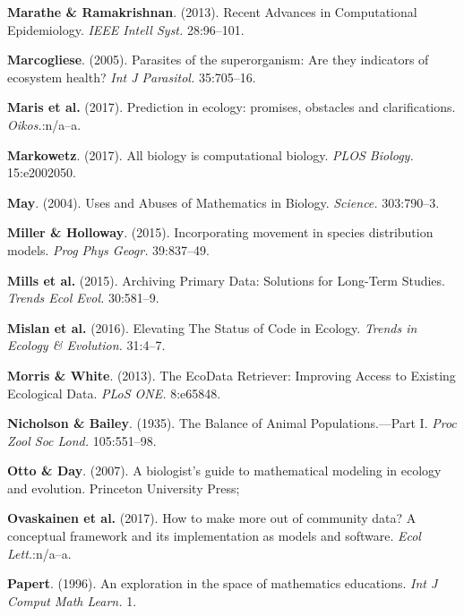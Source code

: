 \documentclass[12pt]{article}
\begin{document}
\leavevmode\hypertarget{ref-MaraRama13}{}%
\textbf{Marathe \& Ramakrishnan}. (2013). Recent Advances in
Computational Epidemiology. \emph{IEEE Intell Syst.} 28:96--101.

\leavevmode\hypertarget{ref-Marc05}{}%
\textbf{Marcogliese}. (2005). Parasites of the superorganism: Are they
indicators of ecosystem health? \emph{Int J Parasitol.} 35:705--16.

\leavevmode\hypertarget{ref-MariHune17}{}%
\textbf{Maris et al.} (2017). Prediction in ecology: promises, obstacles
and clarifications. \emph{Oikos.}:n/a--a.

\leavevmode\hypertarget{ref-Mark17}{}%
\textbf{Markowetz}. (2017). All biology is computational biology.
\emph{PLOS Biology.} 15:e2002050.

\leavevmode\hypertarget{ref-May04}{}%
\textbf{May}. (2004). Uses and Abuses of Mathematics in Biology.
\emph{Science.} 303:790--3.

\leavevmode\hypertarget{ref-MillHoll15}{}%
\textbf{Miller \& Holloway}. (2015). Incorporating movement in species
distribution models. \emph{Prog Phys Geogr.} 39:837--49.

\leavevmode\hypertarget{ref-MillTepl15}{}%
\textbf{Mills et al.} (2015). Archiving Primary Data: Solutions for
Long-Term Studies. \emph{Trends Ecol Evol.} 30:581--9.

\leavevmode\hypertarget{ref-MislHeer16}{}%
\textbf{Mislan et al.} (2016). Elevating The Status of Code in Ecology.
\emph{Trends in Ecology \& Evolution.} 31:4--7.

\leavevmode\hypertarget{ref-MorrWhit13}{}%
\textbf{Morris \& White}. (2013). The EcoData Retriever: Improving
Access to Existing Ecological Data. \emph{PLoS ONE.} 8:e65848.

\leavevmode\hypertarget{ref-NichBail35}{}%
\textbf{Nicholson \& Bailey}. (1935). The Balance of Animal
Populations.---Part I. \emph{Proc Zool Soc Lond.} 105:551--98.

\leavevmode\hypertarget{ref-OttoDay07}{}%
\textbf{Otto \& Day}. (2007). A biologist's guide to mathematical
modeling in ecology and evolution. Princeton University Press;

\leavevmode\hypertarget{ref-OvasTikh17}{}%
\textbf{Ovaskainen et al.} (2017). How to make more out of community
data? A conceptual framework and its implementation as models and
software. \emph{Ecol Lett.}:n/a--a.

\leavevmode\hypertarget{ref-Pape96}{}%
\textbf{Papert}. (1996). An exploration in the space of mathematics
educations. \emph{Int J Comput Math Learn.} 1.
\end{document}
